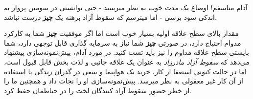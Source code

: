 آدام متاسفم! اوضاع یک مدت خوب به نظر میرسید - حتی توانستی در سومین پرواز
به اندکی سود برسی - اما میترسم که سقوط آزاد برهنه یک \textbf{چیز}
\emph{درست} نباشد.

مقدار بالای سطح علاقه اولیه بسیار خوب است اما اگر موفقیت \textbf{چیز}
شما به کارکرد مدوام احتیاج دارد، در صورتی \textbf{چیز} شما نیاز به
سرمایه گذاری قابل توجهی دارد، شما بایستی سطح علاقه مداوم را نیز باید تست
کنید. در مورد آدام، پیش‌نمونه‌سازی پیشنهاد می‌دهد که \emph{سقوط آزاد
مادرزاد} به عنوان یک علاقه جانبی و لذت بخش قابل قبول است، اما در حالت
کنونی استعفا از کار، خرید یک هواپیما و سعی در گذران زندگی با استفاده از
آن کار غیر معقولی به نظر میرسد. پیش‌نمونه‌سازی او را نجات داد و همچنین
ما را از خطر حضور سقوط آزاد کنندگان لخت را در حیاطمان حفظ کرد.
